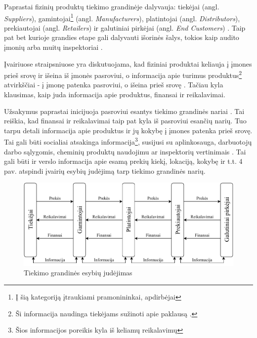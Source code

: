 Paprastai fizinių produktų tiekimo grandinėje dalyvauja: tiekėjai (angl. \textit{Suppliers}), gamintojai\footnote{Į šią kategoriją įtraukiami pramonininkai, apdirbėjai} (angl. \textit{Manufacturers}), platintojai (angl. \textit{Distributors}), prekiautojai (angl. \textit{Retailers}) ir galutiniai pirkėjai (angl. \textit{End Customers}) \cite{kopczak2003supply}. Taip pat bet kurioje grandies etape gali dalyvauti išorinės šalys, tokios kaip audito įmonių arba muitų inspektoriai \cite{webber2009building}.

Įvairiuose straipsniuose yra diskutuojama, kad fiziniai produktai keliauja į įmones prieš srovę ir išeina iš įmonės pasroviui, o informacija apie turimus produktus\footnote{Ši informacija naudinga tiekėjams sužinoti apie paklausą \cite{croson2005upstream}.} atvirkščiai - į įmonę patenka pasroviui, o išeina prieš srovę \cite{prajogo2012supply} \cite{croson2005upstream}. Tačiau kyla klausimas, kaip juda informacija apie produktus, finansai ir reikalavimai.

Užsakymus paprastai inicijuoja pasroviui esantys tiekimo grandinės nariai \cite{croson2005upstream}. Tai reiškia, kad finansai ir reikalavimai taip pat kyla iš pasroviui esančių narių. Tuo tarpu detali informacija apie produktus ir jų kokybę į įmones patenka prieš srovę. Tai gali būti socialiai atsakinga informacija\footnote{Šios informacijos poreikis kyla iš keliamų reikalavimų}, susijusi su aplinkosauga, darbuotojų darbo sąlygomis, cheminių produktų naudojimu ar inspektorių vertinimais \cite{mani2015supply} \cite{vachon2006extending}. Tai gali būti ir verslo informacija apie esamą prekių kiekį, lokaciją, kokybę ir t.t. 4 pav. atspindi įvairių esybių judėjimą tarp tiekimo grandinės narių.

\begin{figure}[H]
    \centering
    \includegraphics[scale=0.9]{images/supply-chain-entity-flow.pdf}
    \caption{Tiekimo grandinės esybių judėjimas}
\end{figure}



